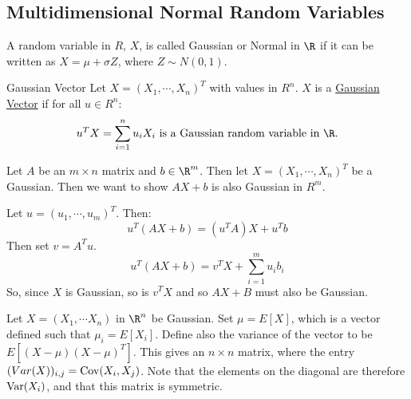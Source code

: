 \documentclass[../Main.tex]{subfiles}
\begin{document}
\subsection{Multidimensional Normal Random Variables}
A random variable in $R$, $X$, is called Gaussian or Normal in $\R$ if it can be written as $X = \mu + \sigma Z$, where $Z \sim N(0, 1)$.
\begin{definition}{Gaussian Vector}
    Let $X = (X_1, \cdots, X_n)^T$ with values in $R^n$. $X$ is a \underline{Gaussian Vector} if for all $u \in R^n$:
    \begin{equation*}
        u^T X = \sum_{i=1}^n u_i X_i \text{ is a Gaussian random variable in } \R.
    \end{equation*}
\end{definition}
\begin{example}
    Let $A$ be an $m \times n$ matrix and $b \in \R^m$. Then let $X = (X_1, \cdots, X_n)^T$ be a Gaussian. Then we want to show $AX + b$ is also Gaussian in $R^m$.

    Let $u = (u_1, \cdots, u_m)^T$. Then:
    \begin{equation*}
        u^T (AX + b) = (u^T A)X + u^T b
    \end{equation*}
    Then set $v = A^T u$.
    \begin{equation*}
        u^T(AX + b) = v^T X + \sum_{i = 1}^m u_i b_i
    \end{equation*}
    So, since $X$ is Gaussian, so is $v^T X$ and so $AX + B$ must also be Gaussian.
\end{example}
Let $X = (X_1, \cdots X_n)$ in $\R^n$ be Gaussian. Set $\mu = E[X]$, which is a vector defined such that $\mu_i = E[X_i]$. Define also the variance of the vector to be $E[(X - \mu)(X - \mu)^T]$. This gives an $n \times n$ matrix, where the entry $(Var(X))_{i, j} = \operatorname{Cov}(X_i, X_j)$. Note that the elements on the diagonal are therefore $\operatorname{Var}(X_i)$, and that this matrix is symmetric.
\end{document}
